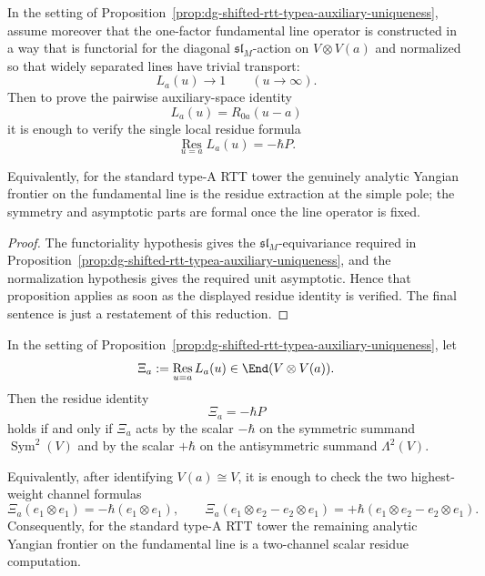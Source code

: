 \begin{corollary}
\label{cor:dg-shifted-rtt-typea-residue-reduction}
In the setting of
Proposition~\ref{prop:dg-shifted-rtt-typea-auxiliary-uniqueness},
assume moreover that the one-factor fundamental line operator is
constructed in a way that is functorial for the diagonal
$\mathfrak{sl}_M$-action on $V\otimes V(a)$ and normalized so that
widely separated lines have trivial transport:
\[
L_a(u)\to 1
\qquad (u\to\infty).
\]
Then to prove the pairwise auxiliary-space identity
\[
L_a(u)=R_{0a}(u-a)
\]
it is enough to verify the single local residue formula
\[
\operatorname*{Res}_{u=a}L_a(u)=-\hbar P.
\]

Equivalently, for the standard type-A RTT tower the genuinely analytic
Yangian frontier on the fundamental line is the residue extraction at
the simple pole; the symmetry and asymptotic parts are formal once the
line operator is fixed.
\end{corollary}

\begin{proof}
The functoriality hypothesis gives the $\mathfrak{sl}_M$-equivariance
required in
Proposition~\ref{prop:dg-shifted-rtt-typea-auxiliary-uniqueness}, and
the normalization hypothesis gives the required unit asymptotic.  Hence
that proposition applies as soon as the displayed residue identity is
verified.  The final sentence is just a restatement of this reduction.
\end{proof}

\begin{proposition}
\label{prop:dg-shifted-rtt-typea-residue-channels}
In the setting of
Proposition~\ref{prop:dg-shifted-rtt-typea-auxiliary-uniqueness}, let
\[
\Xi_a:=\operatorname*{Res}_{u=a}L_a(u)\in \End(V\otimes V(a)).
\]
Then the residue identity
\[
\Xi_a=-\hbar P
\]
holds if and only if $\Xi_a$ acts by the scalar $-\hbar$ on the
symmetric summand $\operatorname{Sym}^2(V)$ and by the scalar $+\hbar$ on the
antisymmetric summand $\Lambda^2(V)$.

Equivalently, after identifying $V(a)\cong V$, it is enough to check
the two highest-weight channel formulas
\[
\Xi_a(e_1\otimes e_1)=-\hbar(e_1\otimes e_1),
\qquad
\Xi_a(e_1\otimes e_2-e_2\otimes e_1)
=+\hbar(e_1\otimes e_2-e_2\otimes e_1).
\]
Consequently, for the standard type-A RTT tower the remaining analytic
Yangian frontier on the fundamental line is a two-channel scalar
residue computation.
\end{proposition}

